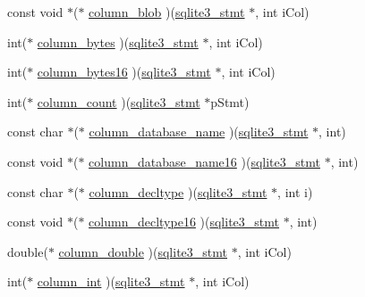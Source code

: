 \begin{DoxyCompactItemize}
\item 
const void $\ast$($\ast$ \hyperlink{structsqlite3__api__routines_aea28365a58adb937fbdf3983fe080e1a}{column\+\_\+blob} )(\hyperlink{sqlite3_8h_af2a033da1327cdd77f0a174a09aedd0c}{sqlite3\+\_\+stmt} $\ast$, int i\+Col)
\item 
int($\ast$ \hyperlink{structsqlite3__api__routines_a4925c38851818eebce76de641da69636}{column\+\_\+bytes} )(\hyperlink{sqlite3_8h_af2a033da1327cdd77f0a174a09aedd0c}{sqlite3\+\_\+stmt} $\ast$, int i\+Col)
\item 
int($\ast$ \hyperlink{structsqlite3__api__routines_a7355fc82d2138b79b2e188fd2de4d269}{column\+\_\+bytes16} )(\hyperlink{sqlite3_8h_af2a033da1327cdd77f0a174a09aedd0c}{sqlite3\+\_\+stmt} $\ast$, int i\+Col)
\item 
int($\ast$ \hyperlink{structsqlite3__api__routines_a3a41d82a8b13513a505889c8c9b1c97e}{column\+\_\+count} )(\hyperlink{sqlite3_8h_af2a033da1327cdd77f0a174a09aedd0c}{sqlite3\+\_\+stmt} $\ast$p\+Stmt)
\item 
const char $\ast$($\ast$ \hyperlink{structsqlite3__api__routines_acd92d7b8700122a8c352d9f03c8fad37}{column\+\_\+database\+\_\+name} )(\hyperlink{sqlite3_8h_af2a033da1327cdd77f0a174a09aedd0c}{sqlite3\+\_\+stmt} $\ast$, int)
\item 
const void $\ast$($\ast$ \hyperlink{structsqlite3__api__routines_a3e38edb955dbd932717bb11283b65490}{column\+\_\+database\+\_\+name16} )(\hyperlink{sqlite3_8h_af2a033da1327cdd77f0a174a09aedd0c}{sqlite3\+\_\+stmt} $\ast$, int)
\item 
const char $\ast$($\ast$ \hyperlink{structsqlite3__api__routines_ae4e78358b212d7d37aa3a47058614c6f}{column\+\_\+decltype} )(\hyperlink{sqlite3_8h_af2a033da1327cdd77f0a174a09aedd0c}{sqlite3\+\_\+stmt} $\ast$, int i)
\item 
const void $\ast$($\ast$ \hyperlink{structsqlite3__api__routines_af5504d756c0ad0526acd0c44f9b2239a}{column\+\_\+decltype16} )(\hyperlink{sqlite3_8h_af2a033da1327cdd77f0a174a09aedd0c}{sqlite3\+\_\+stmt} $\ast$, int)
\item 
double($\ast$ \hyperlink{structsqlite3__api__routines_a6f10fb7f35cebf6cb62a77adfdc70efc}{column\+\_\+double} )(\hyperlink{sqlite3_8h_af2a033da1327cdd77f0a174a09aedd0c}{sqlite3\+\_\+stmt} $\ast$, int i\+Col)
\item 
int($\ast$ \hyperlink{structsqlite3__api__routines_a066b63e4ca0f83af9eaba45b8db3e6be}{column\+\_\+int} )(\hyperlink{sqlite3_8h_af2a033da1327cdd77f0a174a09aedd0c}{sqlite3\+\_\+stmt} $\ast$, int i\+Col)
\item 

\end{DoxyCompactItemize}
